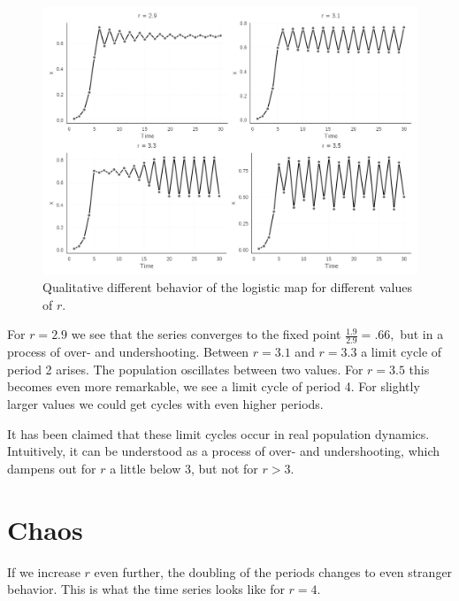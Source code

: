 \documentclass[
  a4paper,
  DIV=11,
  numbers=noendperiod]{scrreprt}
\begin{document}
\begin{figure}

{\centering \includegraphics{media/ch2/fig-ch2-img4.jpg}

}

\caption{\label{fig-ch2-img4}Qualitative different behavior of the
logistic map for different values of \(r\).}

\end{figure}

For \(r = 2.9\) we see that the series converges to the fixed point
\(\frac{1.9}{2.9} = .66,\) but in a process of over- and undershooting.
Between \(r = 3.1\) and \(r = 3.3\) a limit cycle of period 2 arises.
The population oscillates between two values. For \(r = 3.5\) this
becomes even more remarkable, we see a limit cycle of period 4. For
slightly larger values we could get cycles with even higher periods.

It has been claimed that these limit cycles occur in real population
dynamics. Intuitively, it can be understood as a process of over- and
undershooting, which dampens out for \(r\) a little below 3, but not for
\(r > 3\).

\hypertarget{sec-Chaos}{%
\section{Chaos}\label{sec-Chaos}}

If we increase \(r\) even further, the doubling of the periods changes
to even stranger behavior. This is what the time series looks like for
\(r = 4\).
\end{document}
